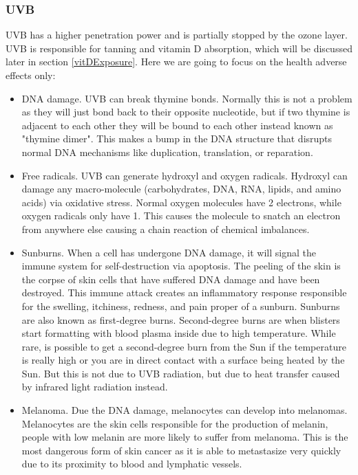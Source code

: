 \subsubsection{UVB}

UVB has a higher penetration power and is partially stopped by the ozone layer. UVB is responsible for tanning and vitamin D absorption, which will be discussed later in section \ref{vitDExposure}. Here we are going to focus on the health adverse effects only:\vspace{3 mm}

\begin{itemize}

\item
DNA damage. UVB can break thymine bonds. Normally this is not a problem as they will just bond back to their opposite nucleotide, but if two thymine is adjacent to each other they will be bound to each other instead known as "thymine dimer". This makes a bump in the DNA structure that disrupts normal DNA mechanisms like duplication, translation, or reparation. 

\item
Free radicals. UVB can generate hydroxyl and oxygen radicals. Hydroxyl can damage any macro-molecule (carbohydrates, DNA, RNA, lipids, and amino acids) via oxidative stress. Normal oxygen molecules have 2 electrons, while oxygen radicals only have 1. This causes the molecule to snatch an electron from anywhere else causing a chain reaction of chemical imbalances.

\item
Sunburns. When a cell has undergone DNA damage, it will signal the immune system for self-destruction via apoptosis. The peeling of the skin is the corpse of skin cells that have suffered DNA damage and have been destroyed. This immune attack creates an inflammatory response responsible for the swelling, itchiness, redness, and pain proper of a sunburn. Sunburns are also known as first-degree burns. Second-degree burns are when blisters start formatting with blood plasma inside due to high temperature. While rare, is possible to get a second-degree burn from the Sun if the temperature is really high or you are in direct contact with a surface being heated by the Sun. But this is not due to UVB radiation, but due to heat transfer caused by infrared light radiation instead.

\item
Melanoma. Due the DNA damage, melanocytes can develop into melanomas. Melanocytes are the skin cells responsible for the production of melanin, people with low melanin are more likely to suffer from melanoma. This is the most dangerous form of skin cancer as it is able to metastasize very quickly due to its proximity to blood and lymphatic vessels.


\end{itemize}
